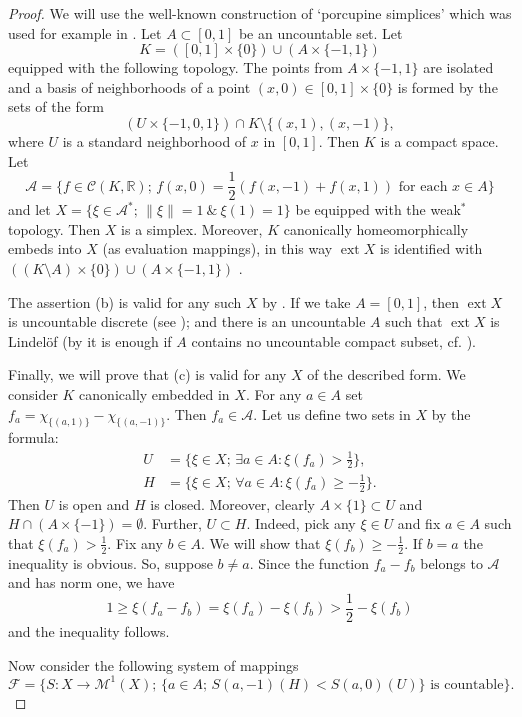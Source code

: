 \documentclass{amsart}
\numberwithin{equation}{section}
\theoremstyle{definition}
\def\A{\mathcal A}
\def\C{\mathcal C}
\def\F{\mathcal F}
\def\M{\mathcal M}
\def\er{\mathbb R}
\def \ext {\operatorname{ext}}
\newcommand{\setsep}{;\,}
\begin{document}
\begin{proof} We will use the well-known construction of `porcupine simplices' which was used for example in \cite{kalenda-bpms}. Let $A\subset [0,1]$ be an uncountable set. Let
$$K=([0,1]\times\{0\})\cup (A\times\{-1,1\})$$
equipped with the following topology. The points from $A\times\{-1,1\}$ are isolated and a basis of neighborhoods of a point $(x,0)\in [0,1]\times\{0\}$ is formed by the sets of the form
$$(U\times\{-1,0,1\})\cap K \setminus\{(x,1),(x,-1)\},$$
where $U$ is a standard neighborhood of $x$ in $[0,1]$. Then $K$ is a compact space. Let
$$\A=\{f\in \C(K,\er)\setsep f(x,0)=\frac12(f(x,-1)+f(x,1))\mbox{ for each }x\in A\}$$
and let $X=\{\xi\in\A^*\setsep\|\xi\|=1\ \&\ \xi(1)=1\}$ be equipped with the weak$^*$ topology.
Then $X$ is a simplex. Moreover, $K$ canonically homeomorphically embeds into $X$ (as evaluation mappings), in this way $\ext X$ is identified with $((K\setminus A)\times\{0\})\cup (A\times\{-1,1\})$ .

The assertion (b) is valid for any such $X$ by \cite[Theorem 1]{kalenda-bpms}. If we take $A=[0,1]$, then $\ext X$ is uncountable discrete (see \cite[Theorem 4]{kalenda-bpms}); and there is an uncountable $A$ such that $\ext X$ is Lindel\"of
(by \cite[Theorem 2]{kalenda-bpms} it is enough if $A$ contains no uncountable compact subset, cf. \cite[p. 69]{kalenda-bpms}).

Finally, we will prove that (c) is valid for any $X$ of the described form. We consider $K$ canonically embedded in $X$. For any $a\in A$ set $f_a=\chi_{\{(a,1)\}}-\chi_{\{(a,-1)\}}$. Then $f_a\in\A$. Let us define two sets in $X$ by the formula:
$$\begin{aligned}
U&=\{\xi\in X\setsep \exists a\in A: \xi(f_a)>\frac12\},\\
H&=\{\xi\in X\setsep \forall a\in A: \xi(f_a)\ge-\frac12\}.
\end{aligned}$$
Then $U$ is open and $H$ is closed. Moreover, clearly $A\times\{1\}\subset U$ and $H\cap( A\times\{-1\})=\emptyset$.
Further, $U\subset H$. Indeed, pick any $\xi\in U$ and fix $a\in A$ such that $\xi(f_a)>\frac12$. Fix any $b\in A$. We will show that $\xi(f_b)\ge-\frac12$. If $b=a$ the inequality is obvious. So, suppose $b\ne a$. Since the function $f_a-f_b$ belongs to $\A$ and has norm one, we have
$$1\ge\xi(f_a-f_b)=\xi(f_a)-\xi(f_b)>\frac12-\xi(f_b)$$
and the inequality follows.

Now consider the following system of mappings
$$\F=\{S\colon X\to\M^1(X)\setsep \{a\in A\setsep S(a,-1)(H)<S(a,0)(U)\}\mbox{ is countable}\}.$$


\end{proof}
\end{document}
